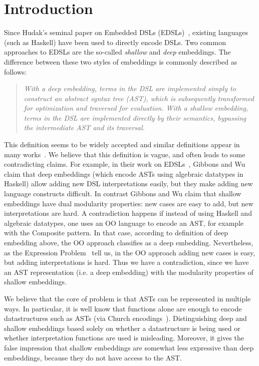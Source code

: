\section{Introduction}

Since Hudak's seminal paper on Embedded DSLs (EDSLs)~\cite{}, existing
languages (such as Haskell) have been used to directly encode
DSLs. Two common approaches to EDSLs are the so-called \emph{shallow}
and \emph{deep} embeddings. The difference between these two styles of
embeddings is commonly described as follows:

\begin{quote}
\emph{With a deep embedding, terms in the DSL are implemented simply to
construct an abstract syntax tree (AST), which is subsequently
transformed for optimization and traversed for evaluation. With a
shallow embedding, terms in the DSL are implemented directly by
their semantics, bypassing the intermediate AST and its traversal.}\cite{gibbons15folding}
\end{quote}

This definition seems to be widely accepted and similar definitions
appear in many works~\cite{}. We believe that this definition is
vague, and often leads to some contradicting
claims. For example, in their work on EDSLs~\cite{}, Gibbons and Wu
claim that deep embeddings (which encode ASTs using algebraic
datatypes in Haskell) allow adding new DSL interpretations easily, but
they make adding new language constructs difficult. In contrast
Gibbons and Wu claim that shallow embeddings have dual modularity
properties: new cases are easy to add, but new interpretations are
hard.  A contradiction happens if instead of using Haskell and
algebraic datatypes, one uses an OO language to encode an AST, for
example with the {\sc Composite} pattern. In that case, according to
definition of deep embedding above, the OO approach classifies as a
deep embedding. Nevertheless, as the Expression Problem~\cite{} tell
us, in the OO approach adding new cases is easy, but adding
interpretations is hard. Thus we have a contradiction, since we have
an AST representation (i.e. a deep embedding) with the modularity
properties of shallow embeddings.

We believe that the core of problem is that ASTs can be represented in
multiple ways. In particular, it is well know that functions alone are
enough to encode datastructures such as ASTs (via Church
encodings~\cite{}). Distinguishing deep and shallow embeddings based
solely on whether a datastructure is being used or whether
interpretation functions are used is misleading. Moreover, it gives
the false impression that shallow embeddings are somewhat less
expressive than deep embeddings, because they do not have access to
the AST.

